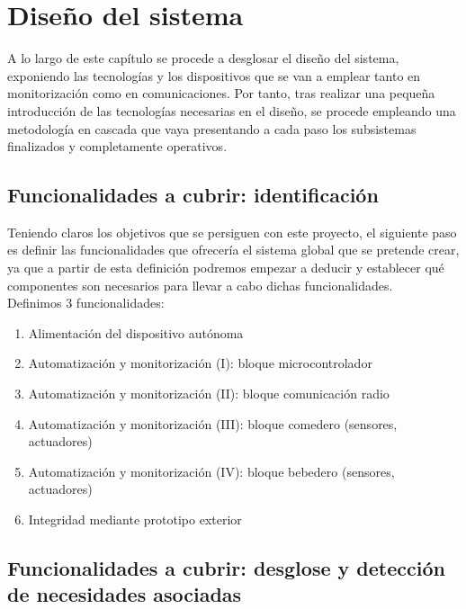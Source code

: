 \documentclass[12pt]{article}
\begin{document}
	\pagebreak
	
	\section[Diseño del sistema]{Diseño del sistema}
	
	\noindent A lo largo de este capítulo se procede a desglosar el diseño del sistema, exponiendo las tecnologías y los dispositivos que se van a emplear tanto en monitorización como en comunicaciones. Por tanto, tras realizar una pequeña introducción de las tecnologías necesarias en el diseño, se procede empleando una metodología en cascada que vaya presentando a cada paso los subsistemas finalizados y completamente operativos.
	
	\subsection[Funcionalidades a cubrir]{Funcionalidades a cubrir: identificación}
	
	\noindent Teniendo claros los objetivos que se persiguen con este proyecto, el siguiente paso es definir las funcionalidades que ofrecería el sistema global que se pretende crear, ya que a partir de esta definición podremos empezar a deducir y establecer qué componentes son necesarios para llevar a cabo dichas funcionalidades. \\
	
	\noindent Definimos 3 funcionalidades: \\
	
	\begin{enumerate}
		\item Alimentación del dispositivo autónoma
		\item Automatización y monitorización (I): bloque microcontrolador
		\item Automatización y monitorización (II): bloque comunicación radio 
		\item Automatización y monitorización (III): bloque comedero (sensores, actuadores)
		\item Automatización y monitorización (IV): bloque bebedero (sensores, actuadores)
		\item Integridad mediante prototipo exterior
	\end{enumerate}
	
	\subsection[Funcionalidades a cubrir]{Funcionalidades a cubrir: desglose y detección de necesidades asociadas}
	
\end{document}
